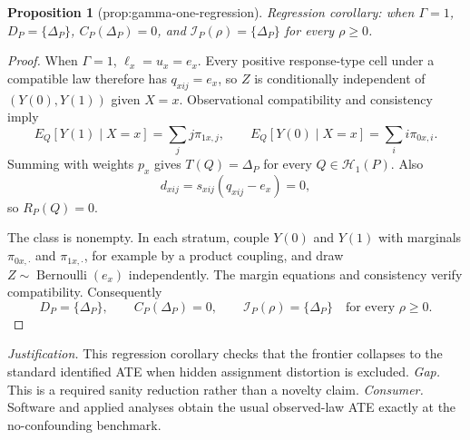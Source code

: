 \documentclass{article}
\newtheorem{proposition}{Proposition}
\begin{document}
\begin{proposition}[prop:gamma-one-regression]\label{prop:gamma-one-regression}
Regression corollary: when \(\Gamma=1\), \(D_P=\{\Delta_P\}\), \(C_P(\Delta_P)=0\), and \(\mathcal I_P(\rho)=\{\Delta_P\}\) for every \(\rho\geq0\).
\end{proposition}
\begin{proof}
When \(\Gamma=1\), \(\ell_x=u_x=e_x\). Every positive response-type cell under a compatible law therefore has \(q_{xij}=e_x\), so \(Z\) is conditionally independent of \((Y(0),Y(1))\) given \(X=x\). Observational compatibility and consistency imply
\[
E_Q[Y(1)\mid X=x]=\sum_jj\pi_{1x,j},\qquad
E_Q[Y(0)\mid X=x]=\sum_ii\pi_{0x,i}. \tag{69}
\]
Summing with weights \(p_x\) gives \(T(Q)=\Delta_P\) for every \(Q\in\mathcal H_1(P)\). Also
\[
d_{xij}=s_{xij}(q_{xij}-e_x)=0,
\]
so \(R_P(Q)=0\).

The class is nonempty. In each stratum, couple \(Y(0)\) and \(Y(1)\) with marginals \(\pi_{0x,\cdot}\) and \(\pi_{1x,\cdot}\), for example by a product coupling, and draw \(Z\sim\operatorname{Bernoulli}(e_x)\) independently. The margin equations and consistency verify compatibility. Consequently
\[
D_P=\{\Delta_P\},\qquad C_P(\Delta_P)=0,\qquad
\mathcal I_P(\rho)=\{\Delta_P\}\quad\text{for every }\rho\geq0.
\]
\end{proof}
\par\smallskip\noindent \textit{Justification.} This regression corollary checks that the frontier collapses to the standard identified ATE when hidden assignment distortion is excluded. \textit{Gap.} This is a required sanity reduction rather than a novelty claim. \textit{Consumer.} Software and applied analyses obtain the usual observed-law ATE exactly at the no-confounding benchmark.
\end{document}
